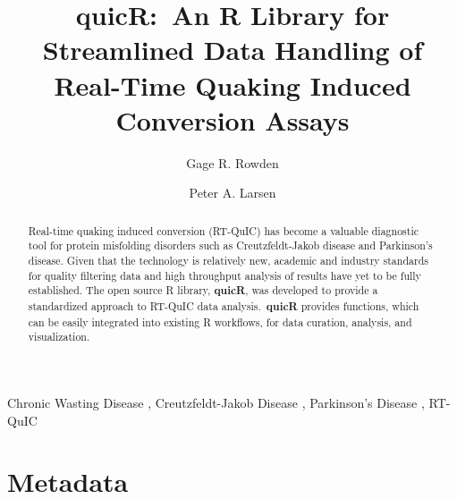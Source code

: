 \documentclass[preprint,12pt,a4paper]{elsarticle}
\begin{document}
    \renewcommand{\labelenumii}{\arabic{enumi}.\arabic{enumii}}

    \begin{frontmatter}

        \title{\textbf{quicR}:\ An R Library for Streamlined Data Handling of Real-Time Quaking Induced Conversion Assays}
        \author[label1,label2,label3]{Gage R. Rowden}
        \author[label1,label2,label3]{Peter A. Larsen}
        \address[label1]{Department of Veterinary and Biomedical Sciences, University of Minnesota, USA.}
        \address[label2]{Minnesota Center for Prion Research and Outreach, University of Minnesota, USA.}
        \address[label3]{Priogen Corp., USA.}

        \begin{abstract}
            Real-time quaking induced conversion (RT-QuIC) has become a valuable diagnostic tool for protein misfolding disorders such as Creutzfeldt-Jakob disease and Parkinson's disease. Given that the technology is relatively new, academic and industry standards for quality filtering data and high throughput analysis of results have yet to be fully established. The open source R library, \textbf{quicR}, was developed to provide a standardized approach to RT-QuIC data analysis.\ \textbf{quicR} provides functions, which can be easily integrated into existing R workflows, for data curation, analysis, and visualization.
        \end{abstract}

        \begin{keyword}
            Chronic Wasting Disease \sep{} Creutzfeldt-Jakob Disease \sep{} Parkinson's Disease \sep{} RT-QuIC
        \end{keyword}

    \end{frontmatter}

    \linenumbers{}

    \section*{Metadata}
\end{document}
